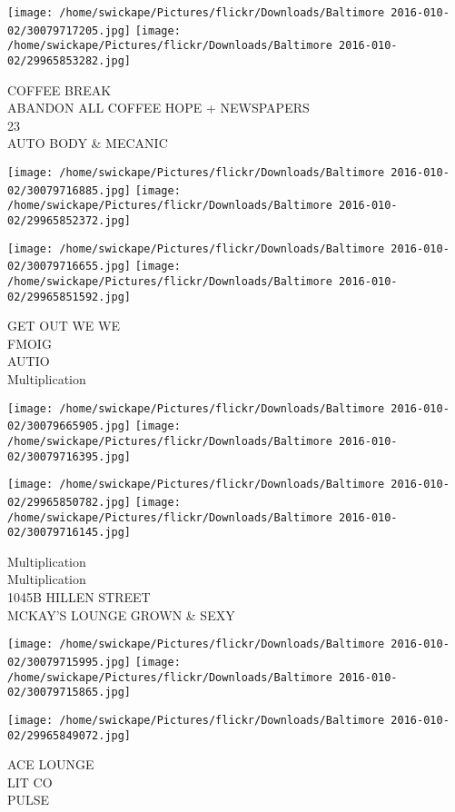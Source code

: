 \documentclass[10pt,letterpaper]{article}
\begin{document}
\texttt{[image: /home/swickape/Pictures/flickr/Downloads/Baltimore 2016-010-02/30079717205.jpg]}
\texttt{[image: /home/swickape/Pictures/flickr/Downloads/Baltimore 2016-010-02/29965853282.jpg]}

COFFEE BREAK\\
ABANDON ALL COFFEE HOPE + NEWSPAPERS\\
23\\
AUTO BODY \& MECANIC\\
\pagebreak

\texttt{[image: /home/swickape/Pictures/flickr/Downloads/Baltimore 2016-010-02/30079716885.jpg]}
\texttt{[image: /home/swickape/Pictures/flickr/Downloads/Baltimore 2016-010-02/29965852372.jpg]}

\texttt{[image: /home/swickape/Pictures/flickr/Downloads/Baltimore 2016-010-02/30079716655.jpg]}
\texttt{[image: /home/swickape/Pictures/flickr/Downloads/Baltimore 2016-010-02/29965851592.jpg]}

GET OUT WE WE\\
FMOIG\\
AUTIO\\
Multiplication\\
\pagebreak

\texttt{[image: /home/swickape/Pictures/flickr/Downloads/Baltimore 2016-010-02/30079665905.jpg]}
\texttt{[image: /home/swickape/Pictures/flickr/Downloads/Baltimore 2016-010-02/30079716395.jpg]}

\texttt{[image: /home/swickape/Pictures/flickr/Downloads/Baltimore 2016-010-02/29965850782.jpg]}
\texttt{[image: /home/swickape/Pictures/flickr/Downloads/Baltimore 2016-010-02/30079716145.jpg]}

Multiplication\\
Multiplication\\
1045B HILLEN STREET\\
MCKAY'S LOUNGE GROWN \& SEXY\\
\pagebreak

\texttt{[image: /home/swickape/Pictures/flickr/Downloads/Baltimore 2016-010-02/30079715995.jpg]}
\texttt{[image: /home/swickape/Pictures/flickr/Downloads/Baltimore 2016-010-02/30079715865.jpg]}

\texttt{[image: /home/swickape/Pictures/flickr/Downloads/Baltimore 2016-010-02/29965849072.jpg]}

ACE LOUNGE\\
LIT CO\\
PULSE\\
\pagebreak
\end{document}
